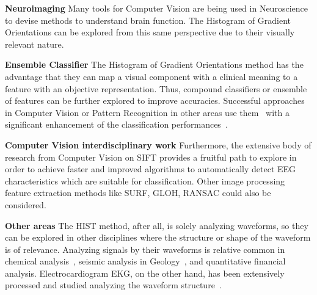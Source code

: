 \textbf{Neuroimaging}
Many tools for Computer Vision are being used in Neuroscience to devise methods to understand brain function.  The Histogram of Gradient Orientations can be explored from this same perspective due to their visually relevant nature.

\textbf{Ensemble Classifier}
The Histogram of Gradient Orientations method has the advantage that they can map a visual component with a clinical meaning to a feature with an objective representation. Thus, compound classifiers or ensemble of features can be further explored to improve accuracies.  Successful approaches in Computer Vision or Pattern Recognition in other areas use them~\cite{Criminisi2013} with a significant enhancement of the classification performances~\cite{Gu2012}.

\textbf{Computer Vision interdisciplinary work}
Furthermore, the extensive body of research from Computer Vision on SIFT provides a fruitful path to explore in order to achieve faster and improved algorithms to automatically detect EEG characteristics which are suitable for classification. Other image processing feature extraction methods like SURF, GLOH, RANSAC could also be considered.

\textbf{Other areas}
The HIST method, after all, is solely analyzing waveforms, so they can be explored in other disciplines where the structure or shape of the waveform is of relevance.  Analyzing signals by their waveforms is relative common in chemical analysis~\cite{Skoog2000}, seismic analysis in Geology~\cite{Owens1984}, and quantitative financial analysis.  Electrocardiogram EKG, on the other hand, has been extensively processed and studied analyzing the waveform structure~\cite{Stockman1976}.



%

